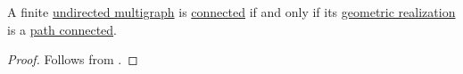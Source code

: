 \begin{corollary}\label{thm:undirected_multigraph_geometric_realization_connectedness}
  A finite \hyperref[def:undirected_multigraph]{undirected multigraph} is \hyperref[def:undirected_multigraph_connectedness]{connected} if and only if its \hyperref[def:directed_multigraph_geometric_realization/undirected]{geometric realization} is a \hyperref[def:path_connected_space]{path connected}.
\end{corollary}
\begin{proof}
  Follows from .
\end{proof}
